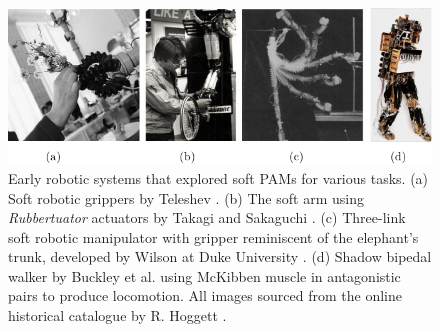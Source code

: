 \begin{figure}[!t]
  \includegraphics*[width=\textwidth]{./pdf/thesis-figure-2-5v2.pdf}
  \vspace{-5mm}
  \caption{Early robotic systems that explored soft PAMs for various tasks. (a) Soft robotic grippers by Teleshev \cite{Teleshev1981}. (b) The soft arm using \textit{Rubbertuator} actuators by Takagi and Sakaguchi \cite{Takagi1983}. (c) Three-link soft robotic manipulator with gripper reminiscent of the elephant's trunk, developed by Wilson at Duke University \cite{Wilson2007,Weisburd1988}. (d) Shadow bipedal walker by Buckley et al. \cite{Buckley2012} using McKibben muscle in antagonistic pairs to produce locomotion.  All images sourced from the online historical catalogue by R. Hoggett \cite{cyberneticzoo}.
  \label{fig:C0:earlyPAMrobots}}
  \vspace{-2mm}
\end{figure}
%

